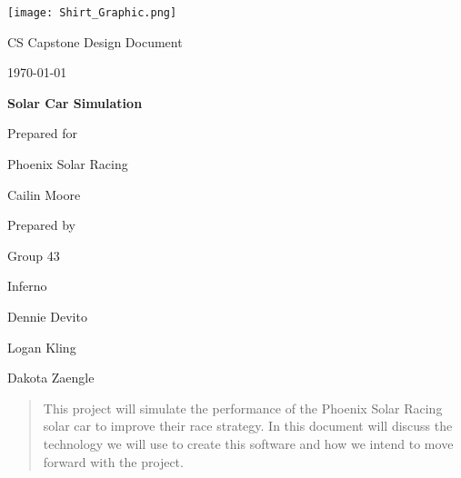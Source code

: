 \documentclass[onecolumn, draftclsnofoot,10pt, compsoc]{IEEEtran}
\def \CapstoneTeamName{		Inferno}
\def \CapstoneTeamNumber{		43}
\def \GroupMemberOne{			Dennie Devito}
\def \GroupMemberTwo{			Logan Kling}
\def \GroupMemberThree{			Dakota Zaengle}
\def \CapstoneProjectName{		Solar Car Simulation}
\def \CapstoneSponsorCompany{	Phoenix Solar Racing}
\def \CapstoneSponsorPerson{		Cailin Moore}
\def \DocType{		%
				Design Document
				}
\newcommand{\NameSigPair}[1]{\par
\makebox[2.75in][r]{#1} \hfil 	\makebox[3.25in]{\makebox[2.25in]{\hrulefill} \hfill		\makebox[.75in]{\hrulefill}}
\par\vspace{-12pt} \textit{\tiny\noindent
\makebox[2.75in]{} \hfil		\makebox[3.25in]{\makebox[2.25in][r]{Signature} \hfill	\makebox[.75in][r]{Date}}}}
\renewcommand{\NameSigPair}[1]{#1}
\begin{document}
\begin{titlepage}
    \begin{singlespace}
        \hfill
        \begin{flushleft}
        \texttt{[image: Shirt\_Graphic.png]}
        \end{flushleft}
        \par\vspace{.2in}
        \centering
        \scshape{
            \huge CS Capstone \DocType \par
            {\large\today}\par
            \vspace{.5in}
            \textbf{\Huge\CapstoneProjectName}\par
            \vfill
            {\large Prepared for}\par
            \Huge \CapstoneSponsorCompany\par
            \vspace{5pt}
            {\Large\NameSigPair{\CapstoneSponsorPerson}\par}
            {\large Prepared by }\par
            Group\CapstoneTeamNumber\par
            \CapstoneTeamName\par 
            \vspace{5pt}
            {\Large
                \NameSigPair{\GroupMemberOne}\par
                \NameSigPair{\GroupMemberTwo}\par
                \NameSigPair{\GroupMemberThree}\par
            }
            \vspace{20pt}
        }
        \begin{abstract}
        This project will simulate the performance of the Phoenix Solar Racing solar car to improve their race strategy. In this document will discuss the technology we will use to create this software and how we intend to move forward with the project. 
        	

        \end{abstract}     
    \end{singlespace}
\end{titlepage}
\newpage
{}
\tableofcontents
\clearpage
\end{document}
